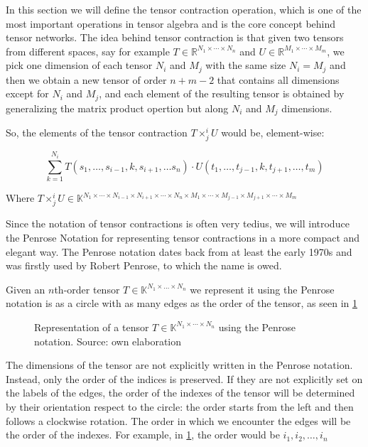 \documentclass[11pt,a4paper,openright,oneside]{book}
\numberwithin{equation}{section}
\newcommand{\figref}[1]{\cref{#1}}
\begin{document}
In this section we will define the tensor contraction operation, which is one of the most important operations
in tensor algebra and is the core concept behind tensor networks.
The idea behind tensor contraction is that given two tensors from different spaces, say for example
$T \in \mathbb{R}^{N_1 \times \cdots \times N_n}$ and $U \in \mathbb{R}^{M_1 \times \cdots \times M_m}$, we pick one dimension of
each tensor $N_i$ and $M_j$ with the same size $N_i = M_j$ and then we obtain a new tensor of order $n + m - 2$ that contains all dimensions except for $N_i$ and $M_j$, and
each element of the resulting tensor is obtained by generalizing the matrix product opertion but along $N_i$ and $M_j$ dimensions.

So, the elements of the tensor contraction $T \times^i_j U$ would be, element-wise:

$$\sum_{k = 1}^{N_i} T(s_1, \dots, s_{i-1}, k, s_{i+1}, \dots s_n) \cdot U(t_1, \dots, t_{j-1}, k, t_{j+1}, \dots, t_m) $$

Where $T \times^i_j U \in \mathbb{K}^{N_1 \times \cdots \times N_{i-1} \times N_{i+1} \times \cdots \times N_n \times M_1 \times \cdots \times 
M_{j-1} \times M_{j+1} \times \cdots \times M_m}$

Since the notation of tensor contractions is often very tedius, we will introduce the Penrose Notation for representing tensor contractions in a
more compact and elegant way. The Penrose notation dates back from at least the early 1970s and was
firstly used by Robert Penrose, to which the name is owed. \cite{rogerPenroseApplications}

Given an $n$th-order tensor $T \in \mathbb{K}^{N_1 \times \dots \times N_n}$ we represent it using the
Penrose notation is as a circle with as many edges as the order of the tensor, as seen in \figref{fig:tens}

\begin{figure}[h]
\centering
{}
\caption{
    Representation of a tensor $T \in \mathbb{K}^{N_1 \times \cdots \times N_n}$ using the Penrose notation. Source: own elaboration
}
\label{fig:tens}
\end{figure}

The dimensions of the tensor are not explicitly written in the Penrose notation. Instead, only the order
of the indices is preserved. If they are not explicitly set on the labels of the edges,
the order of the indexes of the tensor will be determined by their orientation respect to the circle: 
the order starts from the left and then follows a clockwise rotation. The order in which we encounter the edges will be the order of the indexes. 
For example, in \figref{fig:tens}, the order would be $i_1, i_2, \dots, i_n$
\end{document}
